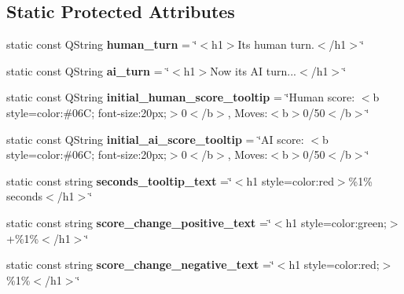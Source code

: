 \subsection*{Static Protected Attributes}
\begin{DoxyCompactItemize}
\item 
static const Q\+String {\bfseries human\+\_\+turn} = \char`\"{}$<$h1$>$It\textquotesingle{}s human turn.$<$/h1$>$\char`\"{}\hypertarget{class_game_view_a8d393d08a1b5e348fc36d848fb9e590b}{}\label{class_game_view_a8d393d08a1b5e348fc36d848fb9e590b}

\item 
static const Q\+String {\bfseries ai\+\_\+turn} = \char`\"{}$<$h1$>$Now it\textquotesingle{}s AI turn...$<$/h1$>$\char`\"{}\hypertarget{class_game_view_a4a605ac7010042321724e49c4a43a485}{}\label{class_game_view_a4a605ac7010042321724e49c4a43a485}

\item 
static const Q\+String {\bfseries initial\+\_\+human\+\_\+score\+\_\+tooltip} = \char`\"{}Human score\+: $<$b style=\textquotesingle{}color\+:\#06\+C; font-\/size\+:20px;\textquotesingle{}$>$0$<$/b$>$, Moves\+:$<$b$>$0/50$<$/b$>$\char`\"{}\hypertarget{class_game_view_a0575767749bddb4f4552bc73caa1f2bd}{}\label{class_game_view_a0575767749bddb4f4552bc73caa1f2bd}

\item 
static const Q\+String {\bfseries initial\+\_\+ai\+\_\+score\+\_\+tooltip} = \char`\"{}AI score\+: $<$b style=\textquotesingle{}color\+:\#06\+C; font-\/size\+:20px;\textquotesingle{}$>$0$<$/b$>$, Moves\+:$<$b$>$0/50$<$/b$>$\char`\"{}\hypertarget{class_game_view_a9503edee1bdd2d5acf8c42d368392b94}{}\label{class_game_view_a9503edee1bdd2d5acf8c42d368392b94}

\item 
static const string {\bfseries seconds\+\_\+tooltip\+\_\+text} =\char`\"{}$<$h1 style=\textquotesingle{}color\+:red\textquotesingle{}$>$\%1\% seconds$<$/h1$>$\char`\"{}\hypertarget{class_game_view_a0875a9ee7af2bf612ee3d0e01bdc4683}{}\label{class_game_view_a0875a9ee7af2bf612ee3d0e01bdc4683}

\item 
static const string {\bfseries score\+\_\+change\+\_\+positive\+\_\+text} =\char`\"{}$<$h1 style=\textquotesingle{}color\+:green;\textquotesingle{}$>$+\%1\%$<$/h1$>$\char`\"{}\hypertarget{class_game_view_a119becaa2deb77dacd5b1e3385c49b2d}{}\label{class_game_view_a119becaa2deb77dacd5b1e3385c49b2d}

\item 
static const string {\bfseries score\+\_\+change\+\_\+negative\+\_\+text} =\char`\"{}$<$h1 style=\textquotesingle{}color\+:red;\textquotesingle{}$>$\%1\%$<$/h1$>$\char`\"{}\hypertarget{class_game_view_a199fa1bbcc63fb0890bbddf6cfa6ba54}{}\label{class_game_view_a199fa1bbcc63fb0890bbddf6cfa6ba54}

\end{DoxyCompactItemize}


